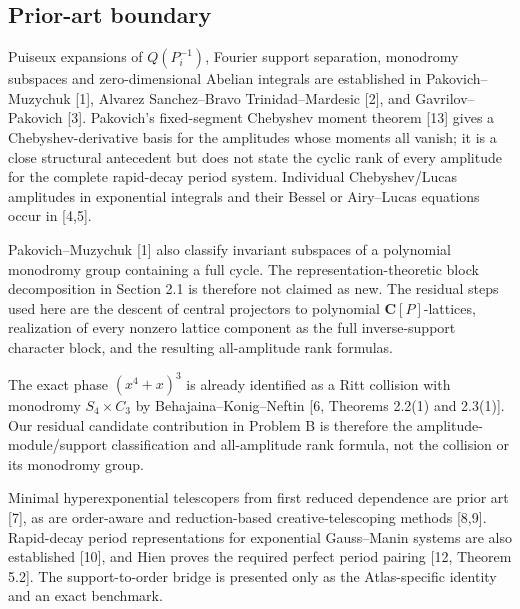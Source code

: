 \documentclass[
  11pt,
  a4paper,
]{amsart}
\begin{document}
\subsection{Prior-art boundary}

Puiseux expansions of \(Q(P_i^{-1})\), Fourier support separation,
monodromy subspaces and zero-dimensional Abelian integrals are
established in Pakovich--Muzychuk {[}1{]}, Alvarez Sanchez--Bravo
Trinidad--Mardesic {[}2{]}, and Gavrilov--Pakovich {[}3{]}. Pakovich's
fixed-segment Chebyshev moment theorem {[}13{]} gives a
Chebyshev-derivative basis for the amplitudes whose moments all vanish;
it is a close structural antecedent but does not state the cyclic rank
of every amplitude for the complete rapid-decay period system.
Individual Chebyshev/Lucas amplitudes in exponential integrals and their
Bessel or Airy--Lucas equations occur in {[}4,5{]}.

Pakovich--Muzychuk {[}1{]} also classify invariant subspaces of a
polynomial monodromy group containing a full cycle. The
representation-theoretic block decomposition in Section 2.1 is therefore
not claimed as new. The residual steps used here are the descent of
central projectors to polynomial \(\mathbf C[P]\)-lattices, realization
of every nonzero lattice component as the full inverse-support character
block, and the resulting all-amplitude rank formulas.

The exact phase \((x^4+x)^3\) is already identified as a Ritt collision
with monodromy \(S_4\times C_3\) by Behajaina--Konig--Neftin {[}6,
Theorems 2.2(1) and 2.3(1){]}. Our residual candidate contribution in
Problem B is therefore the amplitude-module/support classification and
all-amplitude rank formula, not the collision or its monodromy group.

Minimal hyperexponential telescopers from first reduced dependence are
prior art {[}7{]}, as are order-aware and reduction-based
creative-telescoping methods {[}8,9{]}. Rapid-decay period
representations for exponential Gauss--Manin systems are also
established {[}10{]}, and Hien proves the required perfect period
pairing {[}12, Theorem 5.2{]}. The support-to-order bridge is presented
only as the Atlas-specific identity and an exact benchmark.
\end{document}
